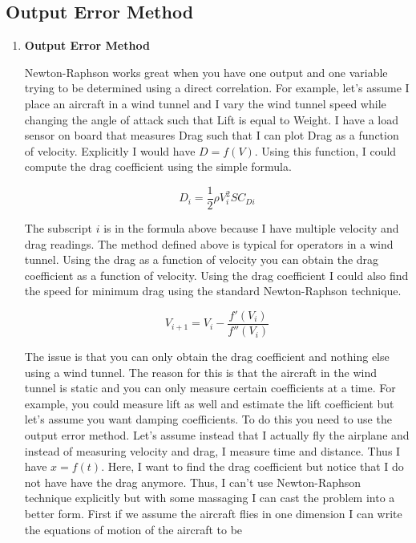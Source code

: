 \subsection{Output Error Method}

\begin{enumerate}

\item{\bf Output Error Method}

Newton-Raphson works great when you have one output and one variable
trying to be determined using a direct correlation. For example, let's
assume I place an aircraft in a wind tunnel and I vary the wind
tunnel speed while changing the angle of attack such that Lift is
equal to Weight. I have a load sensor on board that measures Drag such
that I can plot Drag as a function of velocity. Explicitly I
would have $D = f(V)$. Using this function, I could compute the
drag coefficient using the simple formula. 

\begin{equation}
D_i = \frac{1}2\rho V_i^2 S C_{Di}
\end{equation}

The subscript $i$ is in the formula above because I have multiple
velocity and drag readings. The method defined above is typical for
operators in a wind tunnel. Using the drag as a function of velocity
you can obtain the drag coefficient as a function of velocity. Using
the drag coefficient I could also find the speed for minimum drag
using the standard Newton-Raphson technique.

\begin{equation}
V_{i+1} = V_i - \frac{f'(V_i)}{f''(V_i)}
\end{equation}

The issue is that you can only obtain the drag coefficient and nothing
else using a wind tunnel. The reason for this is that the aircraft in
the wind tunnel is static and you can only measure certain
coefficients at a time. For example, you could measure lift as well
and estimate the lift coefficient but let's assume you want damping
coefficients. To do this you need to use the output error method.
Let's assume instead that I actually fly the airplane and instead of
measuring velocity and drag, I measure time and distance. Thus I have
$x=f(t)$. Here, I want to find the drag coefficient but notice that I
do not have have the drag anymore. Thus, I can't use Newton-Raphson
technique explicitly but with some massaging I can cast the problem
into a better form. First if we assume the aircraft flies in one
dimension I can write the equations of motion of the aircraft to be


\end{enumerate}
